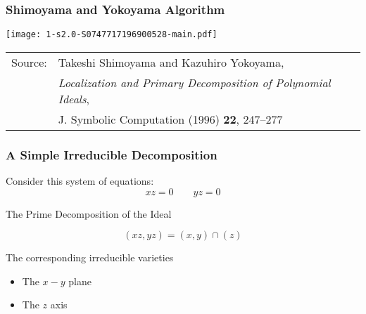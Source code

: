 \documentclass[11pt]{beamer}
\begin{document}
\begin{frame}
\frametitle{Shimoyama and Yokoyama Algorithm}
\texttt{[image: 1-s2.0-S0747717196900528-main.pdf]}

\vfill
\small
\begin{tabular}{ll}
Source: & Takeshi Shimoyama and Kazuhiro Yokoyama, \\
        & {\it Localization and Primary Decomposition of Polynomial Ideals}, \\
        & J. Symbolic Computation (1996) {\bf 22}, 247–277 \\
\end{tabular}
\end{frame}

\begin{frame}
\frametitle{A Simple Irreducible Decomposition}

Consider this system of equations:
\[ xz = 0 \qquad yz = 0 \]

The Prime Decomposition of the Ideal

\[ (xz,yz) = (x,y) \cap (z) \]

The corresponding irreducible varieties

\begin{itemize}
\item The $x-y$ plane
\item The $z$ axis
\end{itemize}

\begin{center}

\end{center}
\end{frame}
\end{document}
